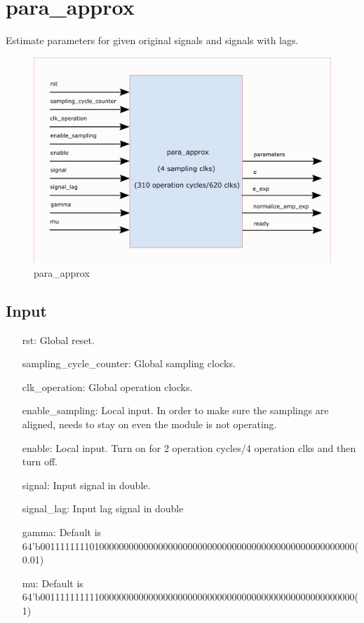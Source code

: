 \documentclass[twoside,a4paper]{refart}
\begin{document}
\section{para\_approx}
Estimate parameters for given original signals and signals with lags.
\begin{figure}[H]
	\centering
	\includegraphics[scale=1.2]{para_approx.png}
	\caption{para\_approx}
	\label{}
\end{figure}
\subsection{Input}
\begin{itemize}
		\item[rst:      ] Global reset.
		\item[sampling\_cycle\_counter:] Global sampling clocks.
		\item[clk\_operation:] Global operation clocks.
		\item[enable\_sampling:] Local input. In order to make sure the samplings are aligned, needs to stay on even the module is not operating.
		\item[enable:] Local input. Turn on for 2 operation cycles/4 operation clks and then turn off.
		\item[signal:] Input signal in double.
		\item[signal\_lag:] Input lag signal in double
		\item[gamma:] Default is\\ 64'b0011111111010000000000000000000000000000000000000000000000000000(0.01)
		\item[mu:   ] Default is\\ 64'b0011111111110000000000000000000000000000000000000000000000000000(1)
		
\end{itemize}
\end{document}
